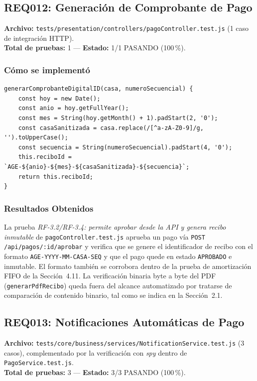 \documentclass[12pt,a4paper]{article}
\begin{document}
\subsection{REQ012: Generación de Comprobante de Pago}
\textbf{Archivo:} \texttt{tests/presentation/controllers/pagoController.test.js} (1 caso de
integración HTTP).\\
\textbf{Total de pruebas:} 1 — \textbf{Estado:} 1/1 PASANDO (100\,\%).

\subsubsection*{Cómo se implementó}

\begin{lstlisting}[caption={\texttt{Pago.generarComprobanteDigitalID} (\texttt{src/core/domain/models/Pago.js})}]
generarComprobanteDigitalID(casa, numeroSecuencial) {
    const hoy = new Date();
    const anio = hoy.getFullYear();
    const mes = String(hoy.getMonth() + 1).padStart(2, '0');
    const casaSanitizada = casa.replace(/[^a-zA-Z0-9]/g, '').toUpperCase();
    const secuencia = String(numeroSecuencial).padStart(4, '0');
    this.reciboId = `AGE-${anio}-${mes}-${casaSanitizada}-${secuencia}`;
    return this.reciboId;
}
\end{lstlisting}

\subsubsection*{Resultados Obtenidos}
La prueba \emph{RF-3.2/RF-3.4: permite aprobar desde la API y genera recibo inmutable}
de \texttt{pagoController.test.js} aprueba un pago vía \texttt{POST /api/pagos/:id/aprobar}
y verifica que se genere el identificador de recibo con el formato
\texttt{AGE-YYYY-MM-CASA-SEQ} y que el pago quede en estado \texttt{APROBADO} e inmutable.
El formato también se corrobora dentro de la prueba de amortización FIFO de la
Sección~4.11. La verificación binaria byte a byte del PDF (\texttt{generarPdfRecibo}) queda
fuera del alcance automatizado por tratarse de comparación de contenido binario, tal como
se indica en la Sección~2.1.

\subsection{REQ013: Notificaciones Automáticas de Pago}
\textbf{Archivo:} \texttt{tests/core/business/services/NotificationService.test.js} (3 casos),
complementado por la verificación con \emph{spy} dentro de \texttt{PagoService.test.js}.\\
\textbf{Total de pruebas:} 3 — \textbf{Estado:} 3/3 PASANDO (100\,\%).
\end{document}
